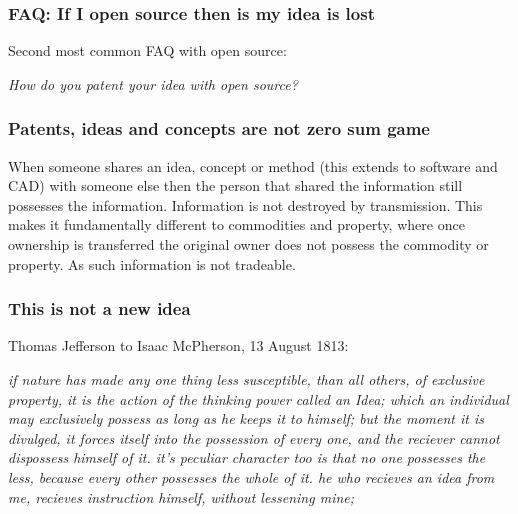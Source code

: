 \documentclass{beamer}
\begin{document}

\begin{frame}
\frametitle{FAQ:  If I open source then is my idea is lost}

Second most common FAQ with open source:  

\begin{center}

\emph{How do you patent your idea with open source?}

\end{center}
\end{frame}


\begin{frame}
\frametitle{Patents, ideas and concepts are not zero sum game}

\begin{center}

When someone shares an idea, concept or method (this extends to software and CAD) with someone else then the person that shared the information still possesses the information.  Information is not destroyed by transmission.  This makes it fundamentally different to commodities and property, where once ownership is transferred the original owner does not possess the commodity or property.  As such information is not tradeable.

\end{center}
\end{frame}

\begin{frame}
\frametitle{This is not a new idea}

\begin{center}

Thomas Jefferson to Isaac McPherson, 13 August 1813:

\emph{if nature has made any one thing less susceptible, than all others, of exclusive property, it is the action of the thinking power called an Idea; which an individual may exclusively possess as long as he keeps it to himself; but the moment it is divulged, it forces itself into the possession of every one, and the reciever cannot dispossess himself of it. it’s peculiar character too is that no one possesses the less, because every other possesses the whole of it. he who recieves an idea from me, recieves instruction himself, without lessening mine; }

\end{center}
\end{frame}
\end{document}
